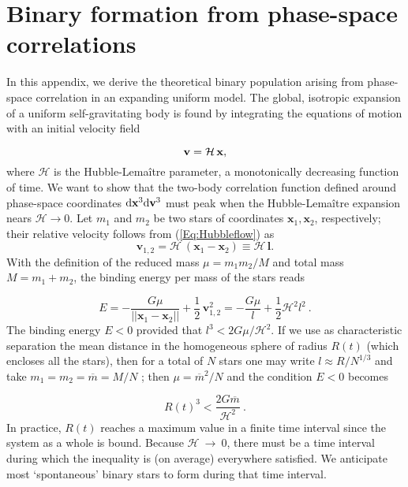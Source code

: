 \chapter{Binary formation from phase-space correlations}
\label{App:phasespace}

In this appendix, we derive the theoretical binary population arising from phase-space correlation in an expanding uniform model. The global, isotropic expansion of a uniform self-gravitating body is found by integrating the equations of motion with an initial  velocity field 

\begin{equation}
 \bold{v} = \mathcal{H}\,\bold{x} , \label{Eq:Hubbleflow}
\end{equation}
where $\mathcal{H}$ is the Hubble-Lema\^itre parameter, a monotonically decreasing function of time. 
We want to show that the two-body correlation function defined around phase-space coordinates ${\rm d} \mathbf{x}^3 {\rm d} \mathbf{v}^3$ must peak when the Hubble-Lema\^itre expansion nears $\mathcal{H}  \rightarrow 0$. Let $m_1$ and $m_2$ be two stars of coordinates $\mathbf{x}_1, \mathbf{x}_2$, respectively; their relative velocity follows from 
(\ref{Eq:Hubbleflow}) as 
\[ \mathbf{v}_{1,2} = \mathcal{H}  ~ ( \mathbf{x}_1 - \mathbf{x}_2 ) \equiv \mathcal{H}\,\mathbf{l} .\]
With the definition of the reduced mass $ \mu = m_1 m_2 / M$ and total mass $M = m_1 + m_2$, the binding energy per mass  of the stars reads 

\begin{equation}
E = - \frac{G \mu}{ || \mathbf{x}_1 - \mathbf{x}_2 || } + \frac{1}{2} \, \mathbf{v}_{1,2}^2 = - \frac{G\mu}{l} + \frac{1}{2} \mathcal{H}^2 l^2 \ . 
\end{equation}
 The binding energy $E < 0 $ provided that $l^3 < 2 G \mu / \mathcal{H}^2$. If we use as characteristic separation the mean 
 distance in the homogeneous sphere of radius $R(t)$ (which encloses all the stars), then for a total of $N$ stars one 
 may write $ l \approx R / N^{1/3}$ and take $ m_1 = m_2 = \overline{m} =  M / N $ ; then $\mu = \overline{m}^2/N$ and 
 the condition $E < 0 $ becomes 
 
 \[ R(t)^3 < \frac{2G\overline{m}}{\mathcal{H}^2}\ . \] 
 In practice, $R(t)$ reaches a maximum value in a finite time interval since the system as a whole is bound. Because $\mathcal{H}~\rightarrow~0$, there must be a time interval during which the inequality is (on average) 
 everywhere satisfied. We anticipate most `spontaneous' binary stars to form during that time interval. 
 
